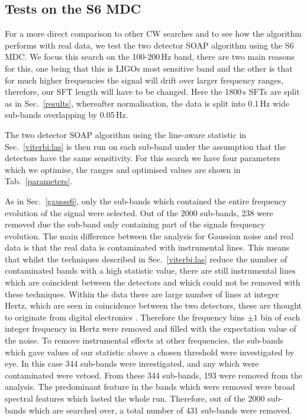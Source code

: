 \subsection{\label{results:s6}Tests on the S6 MDC}
%
%
For a more direct comparison to other \ac{CW} searches and to see how the
algorithm performs with real data, we test the two detector SOAP algorithm using the S6 \ac{MDC}. We focus this search on the 100-200\,Hz band, there are two main reasons for this, one being that this is \acp{LIGO} most sensitive band and the other is that for much higher frequencies the signal will drift over larger frequency ranges, therefore, our \ac{SFT} length will have to be changed.
Here the 1800\,s \acp{SFT} are split as in Sec.~\ref{results}, whereafter normalisation, the data is split into 0.1\,Hz wide sub-bands overlapping by 0.05\,Hz.

The two detector SOAP algorithm using the line-aware statistic in Sec.~\ref{viterbi:las} is then run on each sub-band under the assumption that the detectors have the same sensitivity.
For this search we have four parameters which we optimise, the ranges and optimised values are shown in Tab.~\ref{parameters}.

%
%
As in Sec.~\ref{gausss6}, only the sub-bands which contained the entire frequency evolution of the signal were selected.
Out of the 2000 sub-bands, 238 were removed due the sub-band only containing part of the signals frequency evolution.
The main difference between the analysis for Gaussian noise and real data is that
the real data is contaminated with instrumental lines. This means that whilst the techniques described in Sec.~\ref{viterbi:las} reduce the number of contaminated bands with a high statistic value, there are still
instrumental lines which are coincident between the detectors and which could not be removed
with these techniques. Within the data there are large number of lines at integer Hertz, which are seen in coincidence between the two detectors, these are thought to originate from digital electronics \cite{Coughlin2010}. Therefore the frequency bins $\pm1$ bin of each integer frequency in
Hertz were removed and filled with the expectation value of the noise. To remove instrumental effects at other frequencies,
the sub-bands which gave values of our
statistic above a chosen threshold were investigated by eye. In this case 344 sub-bands were
investigated, and any which were contaminated were vetoed. 
From these 344 sub-bands, 193 were removed from the analysis. The predominant feature in the bands which were removed were broad spectral features which lasted the whole run. Therefore, out of the 2000 sub-bands which are searched over, a total number of 431 sub-bands were removed.

